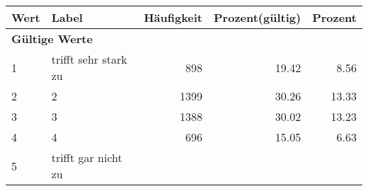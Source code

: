      \begin{longtable}{lXrrr}
     \toprule
     \textbf{Wert} & \textbf{Label} & \textbf{Häufigkeit} & \textbf{Prozent(gültig)} & \textbf{Prozent} \\
     \endhead
     \midrule
     \multicolumn{5}{l}{\textbf{Gültige Werte}}\\

     1 &
     \multicolumn{1}{X}{ trifft sehr stark zu   } &


       \num{898} &
       \num[round-mode=places,round-precision=2]{19.42} &
         \num[round-mode=places,round-precision=2]{8.56} \\

     2 &
     \multicolumn{1}{X}{ 2   } &


       \num{1399} &
       \num[round-mode=places,round-precision=2]{30.26} &
         \num[round-mode=places,round-precision=2]{13.33} \\

     3 &
     \multicolumn{1}{X}{ 3   } &


       \num{1388} &
       \num[round-mode=places,round-precision=2]{30.02} &
         \num[round-mode=places,round-precision=2]{13.23} \\

     4 &
     \multicolumn{1}{X}{ 4   } &


       \num{696} &
       \num[round-mode=places,round-precision=2]{15.05} &
         \num[round-mode=places,round-precision=2]{6.63} \\

     5 &
     \multicolumn{1}{X}{ trifft gar nicht zu   } &



\end{longtable}
